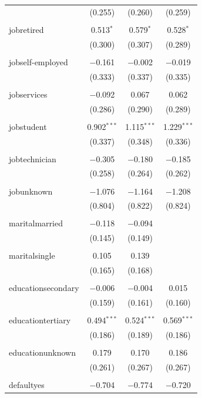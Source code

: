 \documentclass[11pt]{article}
\begin{document}
{\begin{table}[H]
{\begin{tabular}{@{\extracolsep{5pt}}lccc}
  & (0.255) & (0.260) & (0.259) \\ 
  & & & \\ 
 jobretired & 0.513$^{*}$ & 0.579$^{*}$ & 0.528$^{*}$ \\ 
  & (0.300) & (0.307) & (0.289) \\ 
  & & & \\ 
 jobself-employed & $-$0.161 & $-$0.002 & $-$0.019 \\ 
  & (0.333) & (0.337) & (0.335) \\ 
  & & & \\ 
 jobservices & $-$0.092 & 0.067 & 0.062 \\ 
  & (0.286) & (0.290) & (0.289) \\ 
  & & & \\ 
 jobstudent & 0.902$^{***}$ & 1.115$^{***}$ & 1.229$^{***}$ \\ 
  & (0.337) & (0.348) & (0.336) \\ 
  & & & \\ 
 jobtechnician & $-$0.305 & $-$0.180 & $-$0.185 \\ 
  & (0.258) & (0.264) & (0.262) \\ 
  & & & \\ 
 jobunknown & $-$1.076 & $-$1.164 & $-$1.208 \\ 
  & (0.804) & (0.822) & (0.824) \\ 
  & & & \\ 
 maritalmarried & $-$0.118 & $-$0.094 &  \\ 
  & (0.145) & (0.149) &  \\ 
  & & & \\ 
 maritalsingle & 0.105 & 0.139 &  \\ 
  & (0.165) & (0.168) &  \\ 
  & & & \\ 
 educationsecondary & $-$0.006 & $-$0.004 & 0.015 \\ 
  & (0.159) & (0.161) & (0.160) \\ 
  & & & \\ 
 educationtertiary & 0.494$^{***}$ & 0.524$^{***}$ & 0.569$^{***}$ \\ 
  & (0.186) & (0.189) & (0.186) \\ 
  & & & \\ 
 educationunknown & 0.179 & 0.170 & 0.186 \\ 
  & (0.261) & (0.267) & (0.267) \\ 
  & & & \\ 
 defaultyes & $-$0.704 & $-$0.774 & $-$0.720 \\ 

\end{tabular}}
\end{table}}
\end{document}
